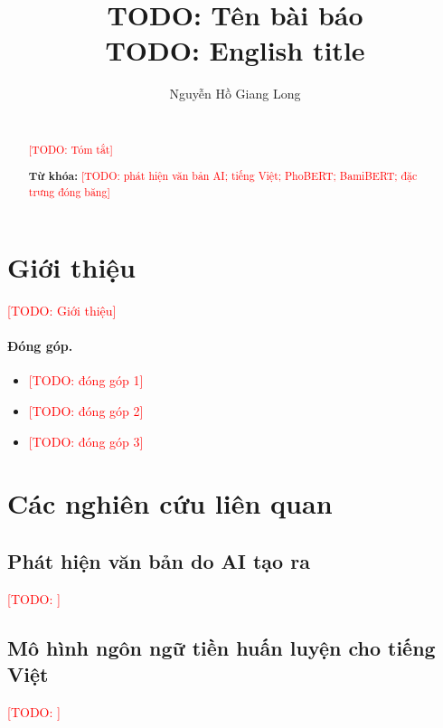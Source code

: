 \documentclass[11pt,a4paper]{article}
\title{\textbf{TODO: Tên bài báo}\\[2pt]
       \large TODO: English title}
\author{Nguyễn Hồ Giang Long \\
        \small \todo{đơn vị} \\
        \small \todo{email}}
\date{}
\newcommand{\todo}[1]{\textcolor{red}{[TODO: #1]}}
\begin{document}
\maketitle

\begin{abstract}
\todo{Tóm tắt}

\medskip
\noindent\textbf{Từ khóa:} \todo{phát hiện văn bản AI; tiếng Việt; PhoBERT; BamiBERT; đặc trưng đóng băng}
\end{abstract}

\section{Giới thiệu}
\label{sec:intro}
\todo{Giới thiệu}

\paragraph{Đóng góp.}
\begin{itemize}
  \item \todo{đóng góp 1}
  \item \todo{đóng góp 2}
  \item \todo{đóng góp 3}
\end{itemize}

\section{Các nghiên cứu liên quan}
\label{sec:related}

\subsection{Phát hiện văn bản do AI tạo ra}
\todo{}

\subsection{Mô hình ngôn ngữ tiền huấn luyện cho tiếng Việt}
\todo{}
\end{document}
